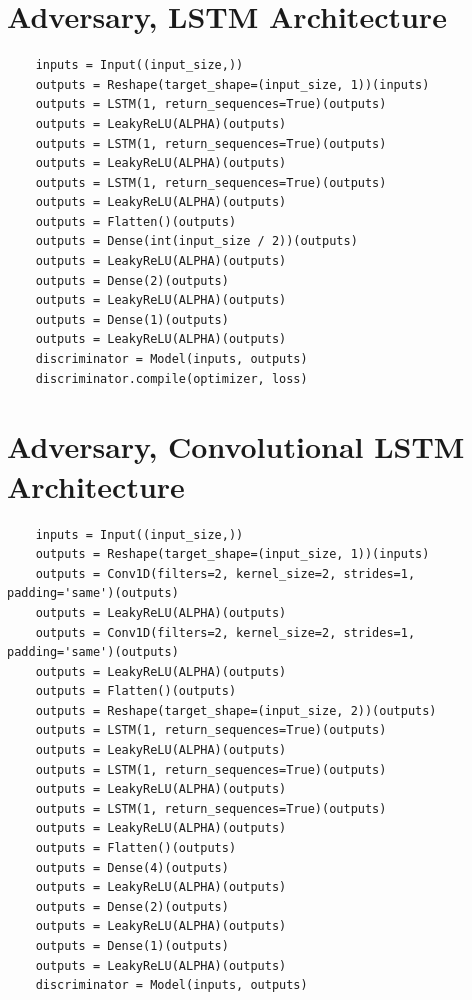 \documentclass[12pt, titlepage]{report}
\theoremstyle{definition}
\begin{document}
\section{Adversary, LSTM Architecture}\label{appendix:lstm}
\begin{verbatim}
    inputs = Input((input_size,))
    outputs = Reshape(target_shape=(input_size, 1))(inputs)
    outputs = LSTM(1, return_sequences=True)(outputs)
    outputs = LeakyReLU(ALPHA)(outputs)
    outputs = LSTM(1, return_sequences=True)(outputs)
    outputs = LeakyReLU(ALPHA)(outputs)
    outputs = LSTM(1, return_sequences=True)(outputs)
    outputs = LeakyReLU(ALPHA)(outputs)
    outputs = Flatten()(outputs)
    outputs = Dense(int(input_size / 2))(outputs)
    outputs = LeakyReLU(ALPHA)(outputs)
    outputs = Dense(2)(outputs)
    outputs = LeakyReLU(ALPHA)(outputs)
    outputs = Dense(1)(outputs)
    outputs = LeakyReLU(ALPHA)(outputs)
    discriminator = Model(inputs, outputs)
    discriminator.compile(optimizer, loss)
\end{verbatim}

\section{Adversary, Convolutional LSTM Architecture}\label{appendix:convlstm}
\begin{verbatim}
    inputs = Input((input_size,))
    outputs = Reshape(target_shape=(input_size, 1))(inputs)
    outputs = Conv1D(filters=2, kernel_size=2, strides=1, padding='same')(outputs)
    outputs = LeakyReLU(ALPHA)(outputs)
    outputs = Conv1D(filters=2, kernel_size=2, strides=1, padding='same')(outputs)
    outputs = LeakyReLU(ALPHA)(outputs)
    outputs = Flatten()(outputs)
    outputs = Reshape(target_shape=(input_size, 2))(outputs)
    outputs = LSTM(1, return_sequences=True)(outputs)
    outputs = LeakyReLU(ALPHA)(outputs)
    outputs = LSTM(1, return_sequences=True)(outputs)
    outputs = LeakyReLU(ALPHA)(outputs)
    outputs = LSTM(1, return_sequences=True)(outputs)
    outputs = LeakyReLU(ALPHA)(outputs)
    outputs = Flatten()(outputs)
    outputs = Dense(4)(outputs)
    outputs = LeakyReLU(ALPHA)(outputs)
    outputs = Dense(2)(outputs)
    outputs = LeakyReLU(ALPHA)(outputs)
    outputs = Dense(1)(outputs)
    outputs = LeakyReLU(ALPHA)(outputs)
    discriminator = Model(inputs, outputs)
\end{verbatim}
\end{document}
